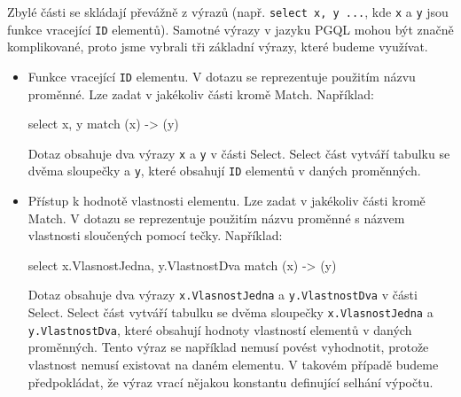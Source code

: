 Zbylé části se skládají převážně z výrazů (např. \texttt{select x, y ...}, kde \texttt{x} a \texttt{y} jsou funkce vracející \texttt{ID} elementů).
Samotné výrazy v jazyku PGQL mohou být značně komplikované, proto jsme vybrali tři základní výrazy, které budeme využívat.
\begin{itemize}

\item Funkce vracející \texttt{ID} elementu. 
V dotazu se reprezentuje použitím názvu proměnné.
Lze zadat v jakékoliv části kromě Match.
Například:
\begin{code}
select x, y match (x) -> (y)
\end{code}
Dotaz obsahuje dva výrazy \texttt{x} a \texttt{y} v části Select.
Select část vytváří tabulku se dvěma sloupečky  a \texttt{y}, které obsahují \texttt{ID} elementů v daných proměnných.

\item 
Přístup k hodnotě vlastnosti elementu.
Lze zadat v jakékoliv části kromě Match.
V dotazu se reprezentuje použitím názvu proměnné s názvem vlastnosti sloučených pomocí tečky.
Například: 
\begin{code}
select x.VlasnostJedna, y.VlastnostDva match (x) -> (y)
\end{code}
Dotaz obsahuje dva výrazy \texttt{x.VlasnostJedna} a \texttt{y.VlastnostDva} v části Select.
Select část vytváří tabulku se dvěma sloupečky \texttt{x.VlasnostJedna} a \texttt{y.VlastnostDva}, které obsahují hodnoty vlastností elementů v daných proměnných.
Tento výraz se například nemusí povést vyhodnotit, protože vlastnost nemusí existovat na daném elementu.
V takovém případě budeme předpokládat, že výraz vrací nějakou konstantu definující selhání výpočtu.


\end{itemize}
